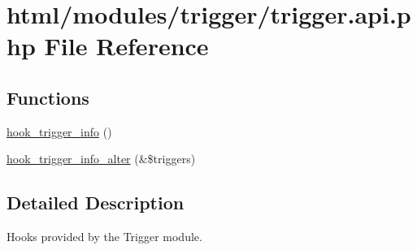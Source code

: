\hypertarget{trigger_8api_8php}{
\section{html/modules/trigger/trigger.api.php File Reference}
\label{trigger_8api_8php}
}
\subsection*{Functions}
\begin{DoxyCompactItemize}
\item 
\hyperlink{group__hooks_ga6796483976be1fa22589582444c6fdbb}{hook\_\-trigger\_\-info} ()
\item 
\hyperlink{group__hooks_gae39072ea60b8856675663f51d5355d57}{hook\_\-trigger\_\-info\_\-alter} (\&\$triggers)
\end{DoxyCompactItemize}


\subsection{Detailed Description}
Hooks provided by the Trigger module. 
